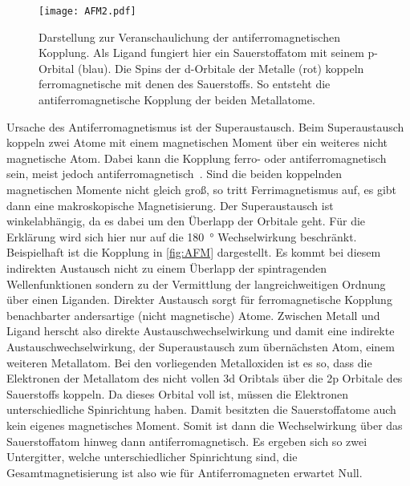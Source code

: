         \begin{figure}
            \centering
            \texttt{[image: AFM2.pdf]}
            \caption{Darstellung zur Veranschaulichung der antiferromagnetischen Kopplung.
            Als Ligand fungiert hier ein Sauerstoffatom mit seinem p-Orbital (blau).
            Die Spins der d-Orbitale der Metalle (rot) koppeln ferromagnetische mit denen des Sauerstoffs.
            So entsteht die antiferromagnetische Kopplung der beiden Metallatome.}
            \label{fig:AFM}
        \end{figure}
        Ursache des Antiferromagnetismus ist der Superaustausch.
        Beim Superaustausch koppeln zwei Atome mit einem magnetischen Moment über ein weiteres nicht magnetische Atom. 
        Dabei kann die Kopplung ferro- oder antiferromagnetisch sein, meist jedoch antiferromagnetisch~\cite{AFM_1}.
        Sind die beiden koppelnden magnetischen Momente nicht gleich groß, so tritt Ferrimagnetismus auf, es gibt dann eine makroskopische Magnetisierung.
        Der Superaustausch ist winkelabhängig, da es dabei um den Überlapp der Orbitale geht.
        Für die Erklärung wird sich hier nur auf die \SI{180}{\degree} Wechselwirkung beschränkt.
        Beispielhaft ist die Kopplung in \autoref{fig:AFM} dargestellt.
        Es kommt bei diesem indirekten Austausch nicht zu einem Überlapp der spintragenden Wellenfunktionen sondern zu der Vermittlung der langreichweitigen Ordnung über einen Liganden.
        Direkter Austausch sorgt für ferromagnetische Kopplung benachbarter andersartige (nicht magnetische) Atome.
        Zwischen Metall und Ligand herscht also direkte Austauschwechselwirkung und damit eine indirekte Austauschwechselwirkung, der Superaustausch zum übernächsten Atom, einem weiteren Metallatom.
        Bei den vorliegenden Metalloxiden ist es so, dass die Elektronen der Metallatom des nicht vollen 3d Oribtals über die 2p Orbitale des Sauerstoffs koppeln.
        Da dieses Orbital voll ist, müssen die Elektronen unterschiedliche Spinrichtung haben.
        Damit besitzten die Sauerstoffatome auch kein eigenes magnetisches Moment.
        Somit ist dann die Wechselwirkung über das Sauerstoffatom hinweg dann antiferromagnetisch.
        Es ergeben sich so zwei Untergitter, welche unterschiedlicher Spinrichtung sind, die Gesamtmagnetisierung ist also wie für Antiferromagneten erwartet Null.

